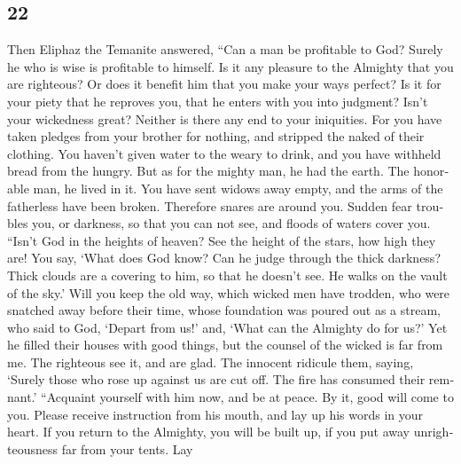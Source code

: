 \begin{paracol}{2}
\switchcolumn
\begin{otherlanguage}{english}

\hypertarget{section-43}{%
\section{22}\label{section-43}}

 Then Eliphaz the Temanite answered,  ``Can
a man be profitable to God? Surely he who is wise is profitable to
himself.  Is it any pleasure to the Almighty that you are
righteous? Or does it benefit him that you make your ways perfect?
 Is it for your piety that he reproves you, that he enters
with you into judgment?  Isn't your wickedness great?
Neither is there any end to your iniquities.  For you have
taken pledges from your brother for nothing, and stripped the naked of
their clothing.  You haven't given water to the weary to
drink, and you have withheld bread from the hungry.  But
as for the mighty man, he had the earth. The honorable man, he lived in
it.  You have sent widows away empty, and the arms of the
fatherless have been broken.  Therefore snares are around
you. Sudden fear troubles you,  or darkness, so that you
can not see, and floods of waters cover you.  ``Isn't God
in the heights of heaven? See the height of the stars, how high they
are!  You say, `What does God know? Can he judge through
the thick darkness?  Thick clouds are a covering to him,
so that he doesn't see. He walks on the vault of the sky.'
 Will you keep the old way, which wicked men have
trodden,  who were snatched away before their time, whose
foundation was poured out as a stream,  who said to God,
`Depart from us!' and, `What can the Almighty do for us?'
 Yet he filled their houses with good things, but the
counsel of the wicked is far from me.  The righteous see
it, and are glad. The innocent ridicule them,  saying,
`Surely those who rose up against us are cut off. The fire has consumed
their remnant.'  ``Acquaint yourself with him now, and be
at peace. By it, good will come to you.  Please receive
instruction from his mouth, and lay up his words in your heart.
 If you return to the Almighty, you will be built up, if
you put away unrighteousness far from your tents.  Lay

\end{otherlanguage}
\end{paracol}
